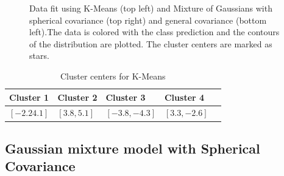 \documentclass[paper=a4, fontsize=11pt]{scrartcl} %
\numberwithin{equation}{section} %
\numberwithin{figure}{section} %
\numberwithin{table}{section} %
\begin{document}
\begin{figure}
\begin{subfigure}{.5\textwidth}
	\end{subfigure}
	\caption{Data fit using K-Means (top left) and Mixture of Gaussians with spherical covariance (top right) and general covariance (bottom left).The data is colored with the class prediction and the contours of the distribution are plotted. The cluster centers are marked as stars.}
\end{figure}

	\begin{table}
		\caption {Cluster centers for K-Means} \label{tab:title} 
		\begin{center}		
			\begin{tabular}{*5l}   
				\toprule
				Cluster 1 & Cluster 2 & Cluster 3 & Cluster 4
				\\\midrule
				$[-2.2  4.1]$ & $[3.8, 5.1]$ & $[-3.8,-4.3]$ & $[3.3, -2.6]$ \\\bottomrule
				\hline
			\end{tabular}
		\end{center}
	\end{table}
	
	
\subsection{Gaussian mixture model with Spherical Covariance}
\end{document}
